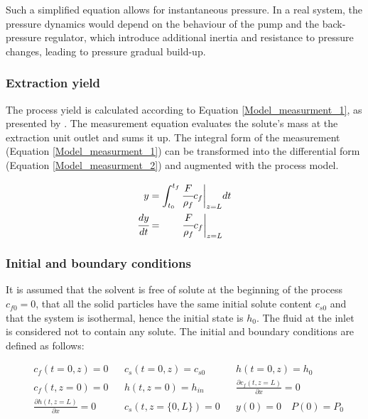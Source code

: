 \documentclass[a4paper,fleqn]{cas-dc}
\begin{document}
	Such a simplified equation allows for instantaneous pressure. In a real system, the pressure dynamics would depend on the behaviour of the pump and the back-pressure regulator, which introduce additional inertia and resistance to pressure changes, leading to pressure gradual build-up.
	
	\subsubsection{Extraction yield} \label{CH: Yield}
	
	The process yield is calculated according to Equation \ref{Model_measurment_1}, as presented by \citet{Sovova1994a}. The measurement equation evaluates the solute's mass at the extraction unit outlet and sums it up. The integral form of the measurement (Equation \ref{Model_measurment_1}) can be transformed into the differential form (Equation \ref{Model_measurment_2}) and augmented with the process model.
	
	{\footnotesize
		\begin{align} 
			\label{Model_measurment_1}
			y &= \int_{t_0}^{t_f} \cfrac{F}{\rho_f} c_f \biggr\rvert_{z=L} dt \\
			\cfrac{dy}{dt} &= \qquad \cfrac{F}{\rho_f} c_f \biggr\rvert_{z=L} 
			\label{Model_measurment_2}
	\end{align}	}
	
	\subsubsection{Initial and boundary conditions} 
	It is assumed that the solvent is free of solute at the beginning of the process $c_{f0}=0$, that all the solid particles have the same initial solute content $c_{s0}$ and that the system is isothermal, hence the initial state is $h_0$. The fluid at the inlet is considered not to contain any solute. The initial and boundary conditions are defined as follows:
	
	{\footnotesize
		\begin{align*}
			&c_f(t = 0, z) = 0  && c_s(t = 0, z) = c_{s0} && h(t = 0, z) = h_0 \\
			&c_f(t,   z=0) = 0  && h(t, z=0) = h_{in}  && \frac{\partial c_f(t,z=L)}{\partial x} = 0 \\
			&\frac{\partial h(t,z=L)}{\partial x} = 0   && c_s(t, z=\{0,L\}) = 0 && y(0) = 0 \quad P(0) = P_0 \\
	\end{align*} }
	
\end{document}
